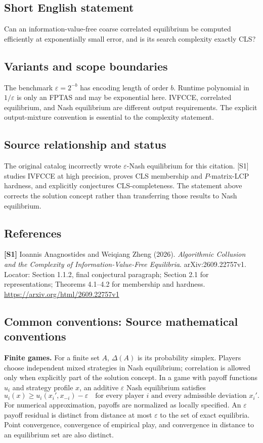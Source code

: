 \documentclass[11pt,a4paper]{article}
\begin{document}
\subsection*{Short English statement}
Can an information-value-free coarse correlated equilibrium be computed efficiently at exponentially small error, and is its search complexity exactly CLS?
\subsection*{Variants and scope boundaries}
The benchmark $\varepsilon=2^{-b}$ has encoding length of order $b$. Runtime polynomial in $1/\varepsilon$ is only an FPTAS and may be exponential here. IVFCCE, correlated equilibrium, and Nash equilibrium are different output requirements. The explicit output-mixture convention is essential to the complexity statement.
\subsection*{Source relationship and status}
The original catalog incorrectly wrote $\varepsilon$-Nash equilibrium for this citation. [S1] studies IVFCCE at high precision, proves CLS membership and $P$-matrix-LCP hardness, and explicitly conjectures CLS-completeness. The statement above corrects the solution concept rather than transferring those results to Nash equilibrium.
\subsection*{References}
\begingroup\footnotesize\raggedright
{\footnotesize\raggedright
\textbf{[S1]} Ioannis Anagnostides and Weiqiang Zheng (2026). \emph{Algorithmic Collusion and the Complexity of Information-Value-Free Equilibria}. arXiv:2609.22757v1. Locator: Section 1.1.2, final conjectural paragraph; Section 2.1 for representations; Theorems 4.1--4.2 for membership and hardness. \url{https://arxiv.org/html/2609.22757v1}\par}
\par\endgroup

\subsection*{Common conventions: Source mathematical conventions}

\textbf{Finite games.} For a finite set $A$, $\Delta(A)$ is its probability
simplex. Players choose independent mixed strategies in Nash equilibrium;
correlation is allowed only when explicitly part of the solution concept.
In a game with payoff functions $u_i$ and strategy profile $x$, an additive
$\varepsilon$ Nash equilibrium satisfies
\[
 u_i(x)\geq u_i(x_i',x_{-i})-\varepsilon
 \quad\text{for every player $i$ and every admissible deviation $x_i'$}.
\]
For numerical approximation, payoffs are normalized as locally specified.
An $\varepsilon$ payoff residual is distinct from distance at most
$\varepsilon$ to the set of exact equilibria. Point convergence, convergence
of empirical play, and convergence in distance to an equilibrium set are
also distinct.
\end{document}
